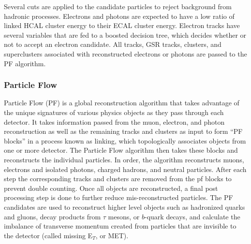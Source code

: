 Several cuts are applied to the candidate particles to reject background from hadronic processes. Electrons and photons are expected to have a low ratio of linked HCAL cluster energy to their ECAL cluster energy. Electron tracks have several variables that are fed to a boosted decision tree, which decides whether or not to accept an electron candidate. All tracks, GSR tracks, clusters, and superclusters associated with reconstructed electrons or photons are passed to the PF algorithm.

\subsubsection{Particle Flow} \label{sec:CMS_PF}
Particle Flow (PF) is a global reconstruction algorithm that takes advantage of the unique signatures of various physics objects as they pass through each detector. It takes information passed from the muon, electron, and photon reconstruction as well as the remaining tracks and clusters as input to form ``PF blocks'' in a process known as linking, which topologically associates objects from one or more detector. The Particle Flow algorithm then takes these blocks and reconstructs the individual particles. In order, the algorithm reconstructs muons, electrons and isolated photons, charged hadrons, and neutral particles. After each step the corresponding tracks and clusters are removed from the pf blocks to prevent double counting. Once all objects are reconstructed, a final post processing step is done to further reduce mis-reconstructed particles. The PF candidates are used to reconstruct higher level objects such as hadronized quarks and gluons, decay products from $\tau$ mesons, or $b$-quark decays, and calculate the imbalance of transverse momentum created from particles that are invisible to the detector (called missing E$_T$, or MET)\cite{Sirunyan:PF}.